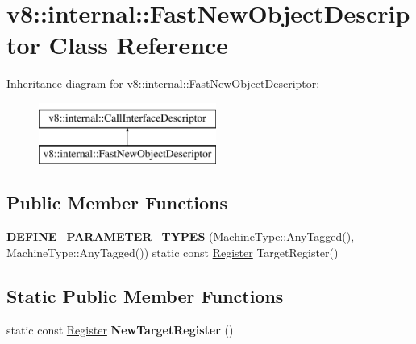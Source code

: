 \hypertarget{classv8_1_1internal_1_1FastNewObjectDescriptor}{}\section{v8\+:\+:internal\+:\+:Fast\+New\+Object\+Descriptor Class Reference}
\label{classv8_1_1internal_1_1FastNewObjectDescriptor}
Inheritance diagram for v8\+:\+:internal\+:\+:Fast\+New\+Object\+Descriptor\+:\begin{figure}[H]
\begin{center}
\leavevmode
\includegraphics[height=2.000000cm]{classv8_1_1internal_1_1FastNewObjectDescriptor}
\end{center}
\end{figure}
\subsection*{Public Member Functions}
\begin{DoxyCompactItemize}
\item 
\mbox{\label{classv8_1_1internal_1_1FastNewObjectDescriptor_abdcde02361ab293a67d91a8aded6a0e8}} 
{\bfseries D\+E\+F\+I\+N\+E\+\_\+\+P\+A\+R\+A\+M\+E\+T\+E\+R\+\_\+\+T\+Y\+P\+ES} (Machine\+Type\+::\+Any\+Tagged(), Machine\+Type\+::\+Any\+Tagged()) static const \mbox{\hyperlink{classv8_1_1internal_1_1Register}{Register}} Target\+Register()
\end{DoxyCompactItemize}
\subsection*{Static Public Member Functions}
\begin{DoxyCompactItemize}
\item 
\mbox{\label{classv8_1_1internal_1_1FastNewObjectDescriptor_a073c275b847365d169a388ce5f27e97b}} 
static const \mbox{\hyperlink{classv8_1_1internal_1_1Register}{Register}} {\bfseries New\+Target\+Register} ()
\end{DoxyCompactItemize}

